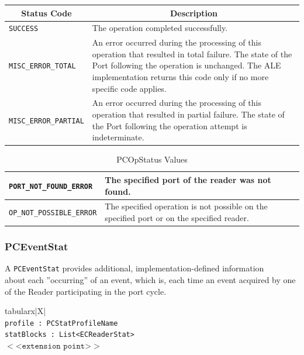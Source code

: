 \documentclass[11pt,a4paper,oneside]{article}
\newenvironment{bbox}%
{\begin{table}[h!]\begin{threeparttable}}%
{\end{threeparttable}\end{table}\FloatBarrier}
\newenvironment{bbox}
{\ifvmode\IgnorePar\fi \EndP\Tg<div class='bbox'>}{\Tg</div>\IgnoreIndent}
\begin{document}
\begin{table}[!h]
\begin{tabular}{
  |p{}%
  |p{}|%
  }
\hline
\multicolumn{1}{|c|}{\textbf{Status Code}}&
\multicolumn{1}{c|}{\textbf{Description}}\\
\hline 
\texttt{SUCCESS} &The operation completed successfully.\\ \hline 
\texttt{MISC\_ERROR\_TOTAL}&An error occurred during the processing of this operation that resulted in total failure. The state of the Port following the operation is unchanged. The ALE implementation returns this code only if no more specific code applies. \\ \hline 
\texttt{MISC\_ERROR\_PARTIAL}&An error occurred during the processing of this operation that resulted in partial failure. The state of the Port following the operation attempt is indeterminate.\\ \hline
\end{tabular}
\end{table}
\begin{table}[!h]
\begin{tabular}{
  |p{}%
  |p{}|%
  }
\hline
\texttt{PORT\_NOT\_FOUND\_ERROR}&The specified port of the reader was not found.\\ \hline
\texttt{OP\_NOT\_POSSIBLE\_ERROR}&The specified operation is not possible on the specified port or on the specified reader.\\ 
\hline
\end{tabular}
\caption{PCOpStatus Values}
\MakeLineNo
\end{table}
\FloatBarrier

\subsubsection{PCEventStat}
\setlength{\intextsep}{0.1cm}
A \texttt{PCEventStat} provides additional, implementation-defined information \ifpdf\\\fi about each ''occurring'' of an event, which is, each time an event acquired by one of the Reader participating in the port cycle.

\begin{bbox}
\begin{edtable}{tabularx}{\linewidth}{|X|}
\hline 
{}
\\
\texttt{profile : PCStatProfileName}\\
\texttt{statBlocks : List<ECReaderStat>}\\
$<$<$\texttt{extension point}$>$>$\\
\texttt{\textendash \textendash \textendash}\\
\hline
\end{edtable}
\end{bbox}
\end{document}
